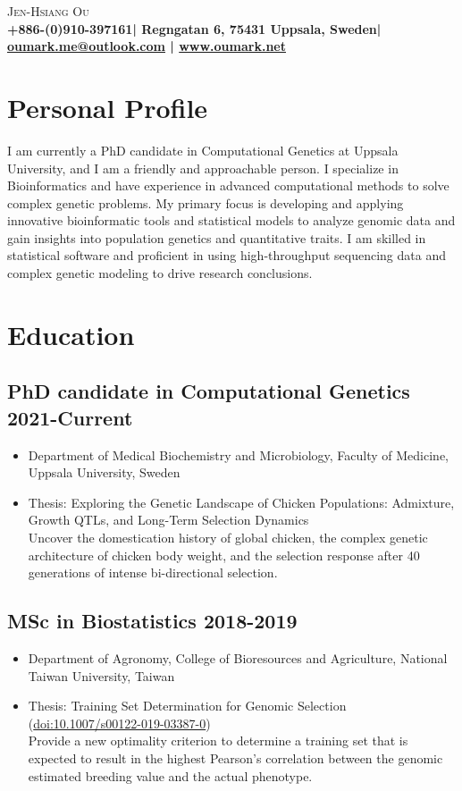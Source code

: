 \documentclass[10pt]{article}
\makeatletter
\def\phone{+886-(0)910-397161}
\def\address{Regngatan 6, 75431 Uppsala, Sweden}
\def\email{oumark.me@outlook.com}
\def\web{www.oumark.net}
\makeatother
\begin{document}
\begin{center}
{\LARGE\scshape Jen-Hsiang Ou}\\[2pt]
{\color{gray}\bf\phone | \address | \href{mailto:\email}{\email} | \url{\web}}
\end{center}


\section*{Personal Profile}
I am currently a PhD candidate in Computational Genetics at Uppsala University, and I am a friendly and approachable person. I specialize in Bioinformatics and have experience in advanced computational methods to solve complex genetic problems. My primary focus is developing and applying innovative bioinformatic tools and statistical models to analyze genomic data and gain insights into population genetics and quantitative traits. I am skilled in statistical software and proficient in using high-throughput sequencing data and complex genetic modeling to drive research conclusions.


\section*{Education}

\subsection*{PhD candidate in Computational Genetics \hfill 2021-Current}
\begin{itemize}
\item Department of Medical Biochemistry and Microbiology, Faculty of Medicine, Uppsala University, Sweden
\item Thesis: Exploring the Genetic Landscape of Chicken Populations: Admixture, Growth QTLs, and Long-Term Selection Dynamics \\ {\color{gray} Uncover the domestication history of global chicken, the complex genetic architecture of chicken body weight, and the selection response after 40 generations of intense bi-directional selection.}
\end{itemize}


\subsection*{MSc in Biostatistics \hfill 2018-2019}
\begin{itemize}
\item Department of Agronomy, College of Bioresources and Agriculture, National Taiwan University, Taiwan
\item Thesis: Training Set Determination for Genomic Selection (\href{https://doi.org/10.1007/s00122-019-03387-0}{doi:10.1007/s00122-019-03387-0}) \\ {\color{gray} Provide a new optimality criterion to determine a training set that is expected to result in the highest Pearson's correlation between the genomic estimated breeding value and the actual phenotype.}
\end{itemize}
\end{document}
